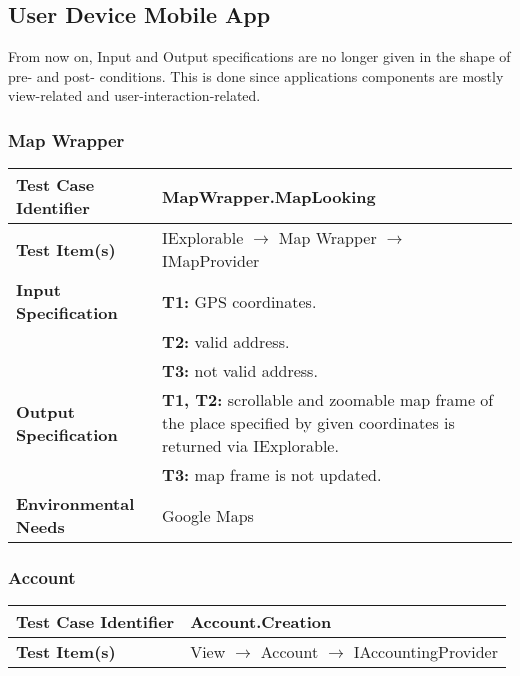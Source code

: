 {%
\subsection{User Device Mobile App}

From now on, Input and Output specifications are no longer given in the shape of pre- and post- conditions. This is done since applications components are mostly view-related and user-interaction-related.

\subsubsection{Map Wrapper}
\noindent
\begin{tabularx}{\textwidth}{l X}
    \hline 
    \textbf{Test Case Identifier} & MapWrapper.MapLooking\\ 
    \hline 
    
    \textbf{Test Item(s)} & IExplorable $\rightarrow$ Map Wrapper $\rightarrow$ IMapProvider\\
    \hline 
    
    \textbf{Input Specification} & \textbf{T1:} GPS coordinates.\\
                                 & \textbf{T2:} valid address.\\
                                 & \textbf{T3:} not valid address.\\
    \hline 
    
    \textbf{Output Specification} & \textbf{T1, T2:} scrollable and zoomable map frame of the place specified by given coordinates is returned via IExplorable.\\
                                & \textbf{T3:} map frame is not updated.\\
    \hline 
    
    \textbf{Environmental Needs} & Google Maps\\
    \hline
\end{tabularx}

\subsubsection{Account}
\noindent
\begin{tabularx}{\textwidth}{l X}
    \hline 
    \textbf{Test Case Identifier} & Account.Creation\\ 
    \hline 
    
    \textbf{Test Item(s)} & View $\rightarrow$ Account $\rightarrow$ IAccountingProvider\\
    \hline 
    

\end{tabularx}}
